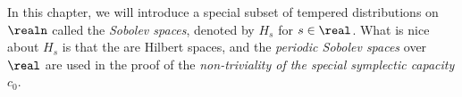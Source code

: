 \documentclass[../main-v2-manifolds.tex]{subfiles}
\begin{document}
\graphicspath{{../images/}{images/}} 
\newpage
{}
In this chapter, we will introduce a special subset of tempered distributions on $\realn$ called the \emph{Sobolev spaces}, denoted by $H_s$ for $s\in\real$. What is nice about $H_s$ is that the are Hilbert spaces, and the \emph{periodic Sobolev spaces} over $\real$ are used in the proof of the \emph{non-triviality of the special symplectic capacity $c_0$}. \\




\end{document}
